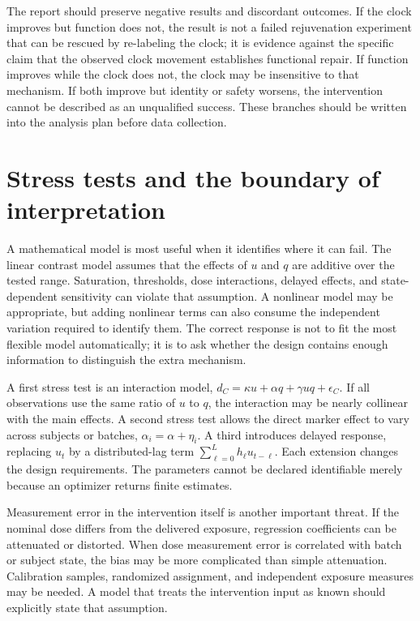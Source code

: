 \documentclass[10pt,a4paper]{article}
\begin{document}
The report should preserve negative results and discordant outcomes. If the clock improves but function does not, the result is not a failed rejuvenation experiment that can be rescued by re-labeling the clock; it is evidence against the specific claim that the observed clock movement establishes functional repair. If function improves while the clock does not, the clock may be insensitive to that mechanism. If both improve but identity or safety worsens, the intervention cannot be described as an unqualified success. These branches should be written into the analysis plan before data collection.

\section{Stress tests and the boundary of interpretation}
A mathematical model is most useful when it identifies where it can fail. The linear contrast model assumes that the effects of \(u\) and \(q\) are additive over the tested range. Saturation, thresholds, dose interactions, delayed effects, and state-dependent sensitivity can violate that assumption. A nonlinear model may be appropriate, but adding nonlinear terms can also consume the independent variation required to identify them. The correct response is not to fit the most flexible model automatically; it is to ask whether the design contains enough information to distinguish the extra mechanism.

A first stress test is an interaction model, \(d_C=\kappa u+\alpha q+\gamma uq+\epsilon_C\). If all observations use the same ratio of \(u\) to \(q\), the interaction may be nearly collinear with the main effects. A second stress test allows the direct marker effect to vary across subjects or batches, \(\alpha_i=\alpha+\eta_i\). A third introduces delayed response, replacing \(u_t\) by a distributed-lag term \(\sum_{\ell=0}^{L}h_\ell u_{t-\ell}\). Each extension changes the design requirements. The parameters cannot be declared identifiable merely because an optimizer returns finite estimates.

Measurement error in the intervention itself is another important threat. If the nominal dose differs from the delivered exposure, regression coefficients can be attenuated or distorted. When dose measurement error is correlated with batch or subject state, the bias may be more complicated than simple attenuation. Calibration samples, randomized assignment, and independent exposure measures may be needed. A model that treats the intervention input as known should explicitly state that assumption.
\end{document}
